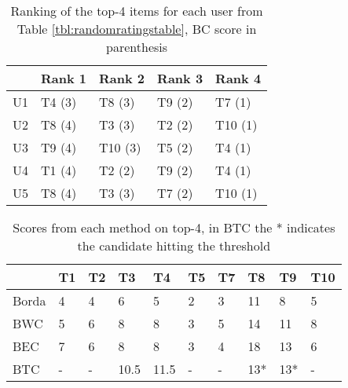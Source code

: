 \begin{table}[H]
	\centering
	\begin{tabular}{|l|l|l|l|l|}
		\hline
		& Rank 1 & Rank 2  & Rank 3 & Rank 4  \\ \hline
		U1 & T4 (3) & T8 (3)  & T9 (2) & T7 (1)  \\ \hline
		U2 & T8 (4) & T3 (3)  & T2 (2) & T10 (1) \\ \hline
		U3 & T9 (4) & T10 (3) & T5 (2) & T4 (1)  \\ \hline
		U4 & T1 (4) & T2 (2)  & T9 (2) & T4 (1)  \\ \hline
		U5 & T8 (4) & T3 (3)  & T7 (2) & T10 (1) \\ \hline
	\end{tabular}
	\caption{Ranking of the top-4 items for each user from Table \ref{tbl:randomratingstable}, BC score in parenthesis}
	\label{tbl:top4borda}
\end{table}

\begin{table}[H]
	\centering
	\begin{tabular}{|l|l|l|l|l|l|l|l|l|l|}
		\hline
		& T1 & T2 & T3   & T4   & T5 & T7 & T8  & T9  & T10 \\ \hline
		Borda & 4  & 4  & 6    & 5    & 2  & 3  & 11  & 8   & 5   \\ \hline
		BWC   & 5  & 6  & 8    & 8    & 3  & 5  & 14  & 11  & 8   \\ \hline
		BEC   & 7  & 6  & 8    & 8    & 3  & 4  & 18  & 13  & 6   \\ \hline
		BTC   & -  & -  & 10.5 & 11.5 & -  & -  & 13* & 13* & -   \\ \hline
	\end{tabular}
	\caption{Scores from each method on top-4, in BTC the * indicates the candidate hitting the threshold}
	\label{tbl:novelscoresexample}
\end{table}
